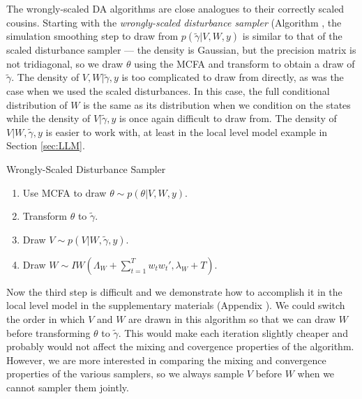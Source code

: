 \documentclass[12pt]{article}
\begin{document}
The wrongly-scaled DA algorithms are close analogues to their correctly scaled cousins. Starting with the {\it wrongly-scaled disturbance sampler} (Algorithm , the simulation smoothing step to draw from $p(\tilde{\gamma}|V,W,y)$ is similar to that of the scaled disturbance sampler --- the density is Gaussian, but the precision matrix is not tridiagonal, so we draw $\theta$ using the MCFA and transform to obtain a draw of $\tilde{\gamma}$. The density of $V,W|\tilde{\gamma},y$ is too complicated to draw from directly, as was the case when we used the scaled disturbances. In this case, the full conditional distribution of $W$ is the same as its distribution when we condition on the states while the density of $V|\tilde{\gamma},y$ is once again difficult to draw from. The density of $V|W,\tilde{\gamma},y$ is easier to work with, at least in the local level model example in Section \ref{sec:LLM}. 
\begin{alg*}[WSD]Wrongly-Scaled Disturbance Sampler\label{alg:DLMwdist}
\begin{enumerate}
\item Use MCFA to draw $\theta \sim p(\theta|V,W,y)$.
\item Transform $\theta$ to $\tilde{\gamma}$.
\item Draw $V \sim p(V|W,\tilde{\gamma},y)$.
\item Draw $W \sim IW\left(\Lambda_W + \sum_{t=1}^Tw_tw_t',\lambda_{W} + T\right)$.
\end{enumerate}
\end{alg*}\noindent
Now the third step is difficult and we demonstrate how to accomplish it in the local level model in the supplementary materials (Appendix ). We could switch the order in which $V$ and $W$ are drawn in this algorithm so that we can draw $W$ before transforming $\theta$ to $\tilde{\gamma}$. This would make each iteration slightly cheaper and probably would not affect the mixing and covergence properties of the algorithm. However, we are more interested in comparing the mixing and convergence properties of the various samplers, so we always sample $V$ before $W$ when we cannot sampler them jointly.
\end{document}
